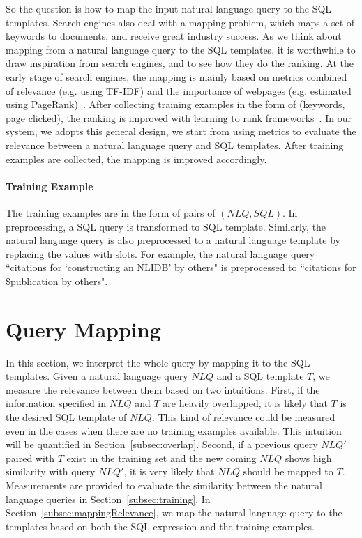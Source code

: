 \documentclass{vldb}
\begin{document}
So the question is how to map the input natural language query to the SQL templates.  Search engines also deal with a mapping problem, which maps a set of keywords to documents, and receive great industry success.  As we think about mapping from a natural language query to the SQL templates, it is worthwhile to draw inspiration from search engines, and to see how they do the ranking.  At the early stage of search engines, the mapping is mainly based on metrics combined of relevance (e.g. using TF-IDF) and the importance of webpages (e.g. estimated using PageRank)~\cite{Page99thepagerank}.  After collecting training examples in the form of (keywords, page clicked), the ranking is improved with learning to rank frameworks~\cite{DBLP:books/daglib/0027504}.  In our system, we adopts this general design, we start from using metrics to evaluate the relevance between a natural language query and SQL templates.  After training examples are collected, the mapping is improved accordingly. 

\paragraph*{Training Example}  The training examples are in the form of pairs of $(NLQ, SQL)$.  In preprocessing, a SQL query is transformed to SQL template.  Similarly, the natural language query is also preprocessed to a natural language template by replacing the values with slots.  For example, the natural language query ``citations for `constructing an NLIDB' by others" is preprocessed to ``citations for \$publication by others". 

\section{Query Mapping}
\label{sec:queryMapping}
In this section, we interpret the whole query by mapping it to the SQL templates.  Given a natural language query $\mathit{NLQ}$ and a SQL template $T$, we measure the relevance between them based on two intuitions.  First, if the information specified in $\mathit{NLQ}$ and $T$ are heavily overlapped, it is likely that $T$ is the desired SQL template of $\mathit{NLQ}$.  This kind of relevance could be measured even in the cases when there are no training examples available.  This intuition will be quantified in Section~\ref{subsec:overlap}.  Second, if a previous query $\mathit{NLQ'}$ paired with $T$ exist in the training set and the new coming $\mathit{NLQ}$ shows high similarity with query $\mathit{NLQ'}$, it is very likely that $\mathit{NLQ}$ should be mapped to $T$.  Measurements are provided to evaluate the similarity between the natural language queries in Section~\ref{subsec:training}. In Section~\ref{subsec:mappingRelevance}, we map the natural language query to the templates based on both the SQL expression and the training examples.  
\end{document}
